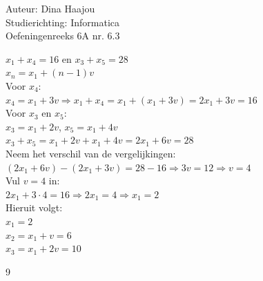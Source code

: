 \documentclass[a4paper]{article}
\begin{document}
\noindent \large Auteur: Dina Haajou \\
\noindent \large Studierichting: Informatica \\
\noindent \large Oefeningenreeks 6A nr. 6.3 \\

\medskip
\normalsize

$x_1 + x_4 = 16$ en $x_3 + x_5 = 28$ \\

$x_n = x_1 + (n-1)v$ \\

Voor $x_4$: \\

$x_4 = x_1 + 3v \Rightarrow x_1 + x_4 = x_1 + (x_1 + 3v) = 2x_1 + 3v = 16$ \\

Voor $x_3$ en $x_5$: \\

$x_3 = x_1 + 2v$, $x_5 = x_1 + 4v$ \\

$x_3 + x_5 = x_1 + 2v + x_1 + 4v = 2x_1 + 6v = 28$ \\

Neem het verschil van de vergelijkingen: \\

$(2x_1 + 6v) - (2x_1 + 3v) = 28 - 16 \Rightarrow 3v = 12 \Rightarrow v = 4$ \\

Vul $v = 4$ in: \\

$2x_1 + 3 \cdot 4 = 16 \Rightarrow 2x_1 = 4 \Rightarrow x_1 = 2$ \\


Hieruit volgt: \\

$x_1 = 2$ \\

$x_2 = x_1 + v = 6$ \\

$x_3 = x_1 + 2v = 10$ \\

\begin{thebibliography}{9}
\end{thebibliography}
\end{document}
